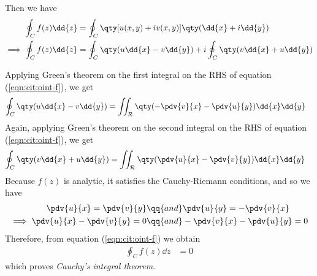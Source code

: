    		Then we have
    		\begin{align}
    			\oint_{C}{f(z)\dd{z}}&=\oint_{C}{\qty[u(x,y)+iv(x,y)]\qty(\dd{x}+i\dd{y})} \nonumber\\
    			\implies\oint_{C}{f(z)\dd{z}}&=\oint_{C}{\qty(u\dd{x}-v\dd{y})}+i\oint_{C}{\qty(v\dd{x}+u\dd{y})} \label{eqn:cit:oint-f}
    		\end{align}
    		
    		Applying Green's theorem on the first integral on the RHS of equation (\ref{eqn:cit:oint-f}), we get
    		\begin{align}
    			\oint_{C}{\qty(u\dd{x}-v\dd{y})}&=\iint_{\mathcal{R}}{\qty(-\pdv{v}{x}-\pdv{u}{y})\dd{x}\dd{y}} \label{eqn:cit:integ-1}
    		\end{align}
    		Again, applying Green's theorem on the second integral on the RHS of equation (\ref{eqn:cit:oint-f}), we get
    		\begin{align}
    			\oint_{C}{\qty(v\dd{x}+u\dd{y})}&=\iint_{\mathcal{R}}{\qty(\pdv{u}{x}-\pdv{v}{y})\dd{x}\dd{y}} \label{eqn:cit:integ-2}
    		\end{align}
    		Because $f(z)$ is analytic, it satisfies the Cauchy-Riemann conditions, and so we have
    		\begin{align*}
    			\pdv{u}{x}=\pdv{v}{y}&\qq{and}\pdv{u}{y}=-\pdv{v}{x} \\
    			\implies\pdv{u}{x}-\pdv{v}{y}=0&\qq{and}-\pdv{v}{x}-\pdv{u}{y}=0
    		\end{align*}
    		Therefore, from equation (\ref{eqn:cit:oint-f}) we obtain
    		\begin{align*}
    			\oint_{C}{f(z)\dd{z}}&=0
    		\end{align*}
    		which proves \emph{Cauchy's integral theorem}.
    		
